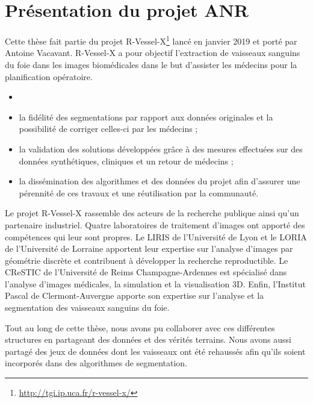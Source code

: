 \section{Présentation du projet ANR}
\label{sec:introduction:objectifs}

Cette thèse fait partie du projet R-Vessel-X\footnote{\url{http://tgi.ip.uca.fr/r-vessel-x/}} lancé en janvier 2019 et porté par Antoine Vacavant. R-Vessel-X a pour objectif l'extraction de vaisseaux sanguins du foie dans les images biomédicales dans le but d'assister les médecins pour la planification opératoire. 

\begin{itemize}
\item {}
\item la fidélité des segmentations par rapport aux données originales et la possibilité de corriger celles-ci par les médecins ;
\item la validation des solutions développées grâce à des mesures effectuées sur des données synthétiques, cliniques et un retour de médecins ;
\item la dissémination des algorithmes et des données du projet afin d'assurer une pérennité de ces travaux et une réutilisation par la communauté.
\end{itemize}

Le projet R-Vessel-X rassemble des acteurs de la recherche publique ainsi qu'un partenaire industriel. Quatre laboratoires de traitement d'images ont apporté des compétences qui leur sont propres. Le LIRIS de l'Université de Lyon et le LORIA de l'Université de Lorraine apportent leur expertise sur l'analyse d'images par géométrie discrète et contribuent à développer la recherche reproductible. Le CReSTIC de l'Université de Reims Champagne-Ardennes est spécialisé dans l'analyse d'images médicales, la simulation et la visualisation 3D. Enfin, l'Institut Pascal de Clermont-Auvergne apporte son expertise sur l'analyse et la segmentation des vaisseaux sanguins du foie. 

Tout au long de cette thèse, nous avons pu collaborer avec ces différentes structures en partageant des données et des vérités terrains. Nous avons aussi partagé des jeux de données dont les vaisseaux ont été rehaussés afin qu'ils soient incorporés dans des algorithmes de segmentation.


